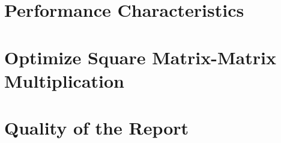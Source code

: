 \documentclass[unicode,11pt,a4paper,oneside,numbers=endperiod,openany]{scrartcl}
\begin{document}
\section{Performance Characteristics }


\section{Optimize Square Matrix-Matrix Multiplication  }


\section{Quality of the Report  }
\end{document}
